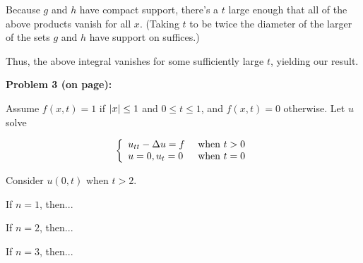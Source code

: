 \documentclass[a4paper,12pt]{article}
\begin{document}
Because $g$ and $h$ have compact support, there's a $t$ large enough that all of the above products vanish for all $x$. (Taking $t$ to be twice the diameter of the larger of the sets $g$ and $h$ have support on suffices.)

Thus, the above integral vanishes for some sufficiently large $t$, yielding our result.

\shunt

{\bf Problem 3 (on page):}

Assume $f(x,t) = 1$ if $\left\lvert x \right\rvert \leq 1$ and $0\leq t \leq 1$, and $f(x,t) = 0$ otherwise. Let $u$ solve

\begin{displaymath}
   \left\{
     \begin{array}{lr}
       u_{tt} - \Delta u = f  & \text{ when } t>0 \\
       u=0, u_t = 0 & \text{ when } t=0 \\
     \end{array}
   \right.
\end{displaymath}

Consider $u(0,t)$ when $t>2$.

If $n = 1$, then... %

If $n = 2$, then...

If $n = 3$, then... %

\shunt
\end{document}
